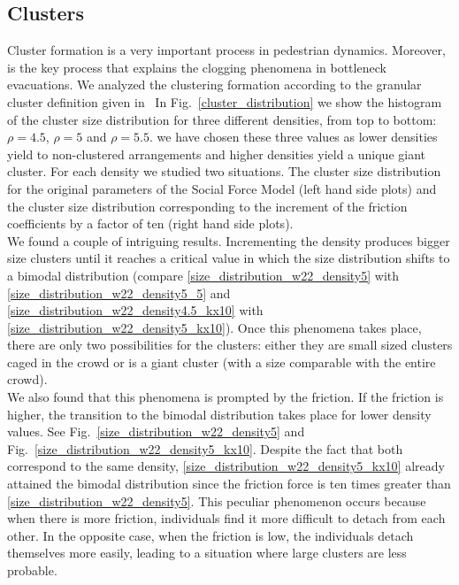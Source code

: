 \subsection{\label{clusters}Clusters}

Cluster formation is a very important process in pedestrian dynamics. Moreover, is the key process that explains the clogging phenomena in bottleneck evacuations. We analyzed the clustering formation according to the granular cluster definition given in~\cite{Dorso1}
In Fig.~\ref{cluster_distribution} we show the histogram of the cluster size distribution for three different densities, from top to bottom: $\rho=4.5$, $\rho=5$ and $\rho=5.5$. we have chosen these three values as lower densities yield to non-clustered arrangements and higher densities yield a unique giant cluster.     
For each density we studied two situations. The cluster size distribution for the original parameters of the Social Force Model (left hand side plots) and the cluster size distribution corresponding to the increment of the friction coefficients by a factor of ten (right hand side plots).\\

We found a couple of intriguing results. Incrementing the density produces bigger size clusters until it reaches a critical value in which the size distribution shifts to a bimodal distribution (compare \ref{size_distribution_w22_density5} with \ref{size_distribution_w22_density5_5} and \ref{size_distribution_w22_density4.5_kx10} with \ref{size_distribution_w22_density5_kx10}).  Once this phenomena takes place, there are only two possibilities for the clusters: either they are small sized clusters caged in the crowd or is a giant cluster (with a size comparable with the entire crowd).\\

We also found that this phenomena is prompted by the friction. If the friction is higher, the transition to the bimodal distribution takes place for lower density values. See Fig.~\ref{size_distribution_w22_density5} and Fig.~\ref{size_distribution_w22_density5_kx10}. Despite the fact that both correspond to the same density,  \ref{size_distribution_w22_density5_kx10} already attained the bimodal distribution since the friction force is ten times greater than \ref{size_distribution_w22_density5}. This peculiar phenomenon occurs because when there is more friction, individuals find it more difficult to detach from each other. In the opposite case, when the friction is low, the individuals detach themselves more easily, leading to a situation where large clusters are less probable.\\

